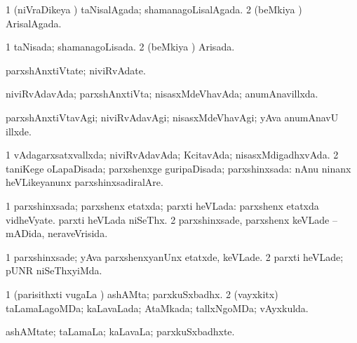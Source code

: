{{\bentry
{} 
\gl{\gu}
\expl{}
\bmng
\bnum
\num{1} (niVraDikeya \vi) taNisalAgada; shamanagoLisalAgada. 
\num{2} (beMkiya \vi) ArisalAgada. 
\enum
\emng
\eentry

\bentry
{} 
\gl{\gu}
\bmng
\bnum
\num{1} taNisada; shamanagoLisada. 
\num{2} (beMkiya \vi) Arisada. 
\enum
\emng
\eentry

\bentry
{} 
\gl{\nA}
\expl{}
\bmng
parxshAnxtiVtate; niviRvAdate. 
\emng
\eentry

\bentry
{} 
\gl{\gu}
\expl{}
\bmng
niviRvAdavAda; parxshAnxtiVta; nisasxMdeVhavAda; anumAnavillxda. 
\emng
\eentry

\bentry
{} 
\gl{\nA}
\expl{}
\bmng
{} 
\emng
\eentry

\bentry
{} 
\gl{\kirxvi\ \nA}
\expl{}
\bmng
parxshAnxtiVtavAgi; niviRvAdavAgi; nisasxMdeVhavAgi; yAva anumAnavU illxde. 
\emng
\eentry

\bentry
{} 
\gl{\gu}
\expl{}
\bmng
\bnum
\num{1} vAdagarxsatxvallxda; niviRvAdavAda; KcitavAda; nisasxMdigadhxvAda. 
\num{2} taniKege oLapaDisada; parxshenxge guripaDisada; parxshinxsada:  nAnu ninanx heVLikeyanunx parxshinxsadiralAre. 
\enum
\emng
\eentry

\bentry
{} 
\gl{\gu}
\expl{}
\bmng
\bnum
\num{1} parxshinxsada; parxshenx etatxda; parxti heVLada:  parxshenx etatxda vidheVyate.  parxti heVLada niSeThx. 
\num{2} parxshinxsade, parxshenx keVLade -- mADida, neraveVrisida. 
\enum
\emng
\eentry

\bentry
{} 
\gl{\kirxvi}
\expl{}
\bmng
\bnum
\num{1} parxshinxsade; yAva parxshenxyanUnx etatxde, keVLade. 
\num{2} parxti heVLade; pUNR niSeThxyiMda. 
\enum
\emng
\eentry

\bentry
{} 
\gl{\gu}
\expl{}
\bmng
\bnum
\num{1} (parisithxti \mo vugaLa \vi) ashAMta; parxkuSxbadhx. 
\num{2} (vayxkitx) taLamaLagoMDa; kaLavaLada; AtaMkada; tallxNgoMDa; vAyxkulda. 
\enum
\emng
\eentry

\bentry
{} 
\gl{\nA}
\expl{}
\bmng
ashAMtate; taLamaLa; kaLavaLa; parxkuSxbadhxte. 
\emng
\eentry

}}
